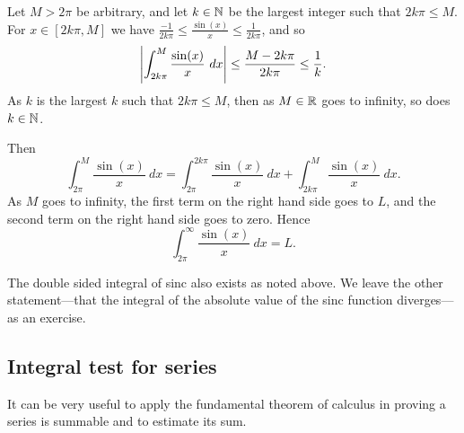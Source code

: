 \begin{example}
Let $M > 2\pi$ be arbitrary, and let $k \in {\mathbb{N}}$
be the largest integer such that $2k\pi \leq M$.
For $x \in [2k\pi,M]$ we have 
$\frac{-1}{2k\pi} \leq \frac{\sin(x)}{x} \leq \frac{1}{2k\pi}$, and so
\begin{equation*}
\left\lvert {\int_{2k\pi}^{M} \frac{\sin(x)}{x} ~dx } \right\rvert  \leq
\frac{M-2k\pi}{2k\pi} \leq \frac{1}{k} .
\end{equation*}
As $k$ is the largest $k$ such that $2k\pi \leq M$,
then as $M\in {\mathbb{R}}$ goes to infinity, so does $k \in {\mathbb{N}}$.

Then
\begin{equation*}
\int_{2\pi}^M \frac{\sin(x)}{x}~dx
=
\int_{2\pi}^{2k\pi} \frac{\sin(x)}{x} ~dx
+
\int_{2k\pi}^{M} \frac{\sin(x)}{x} ~dx .
\end{equation*}
As $M$ goes to infinity,
the first term on the
right hand side goes to $L$,
and the second term on the
right hand side
goes to zero.  Hence
\begin{equation*}
\int_{2\pi}^\infty \frac{\sin(x)}{x} ~dx = L .
\end{equation*}

The double sided integral of sinc also exists as noted above.
We leave the other statement---that the integral
of the absolute value of the sinc function diverges---as an exercise.
\end{example}

\subsection{Integral test for series}

It can be very useful to apply the fundamental theorem 
of calculus in proving a series is summable and to estimate its sum.

